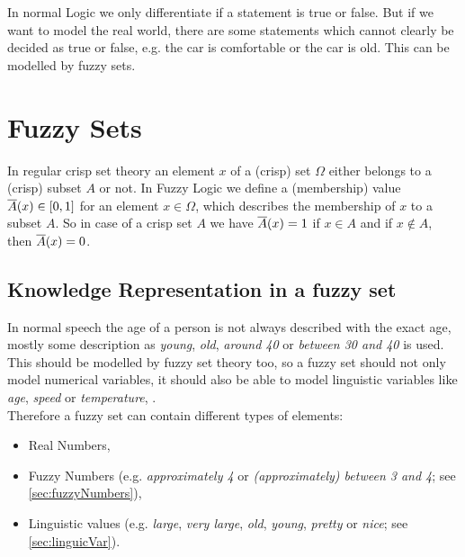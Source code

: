 

In normal Logic we only differentiate if a statement is true or false. But if we want to model the real world, there are some statements which cannot clearly be decided as true or false, e.g. the car is comfortable or the car is old. This can be modelled by fuzzy sets.


\section{Fuzzy Sets}
In regular crisp set theory an element $x$ of a (crisp) set $\Omega$ either belongs to a (crisp) subset $A$ or not. In Fuzzy Logic we define a (membership) value $\overline{A}(x)\in[0,1]$ for an element $x\in\Omega$, which describes the membership of $x$ to a subset $A$. So in case of a crisp set $A$ we have $\overline{A}(x)=1$ if $x\in A$ and if $x\notin A$, then $\overline{A}(x)=0$.

\subsection{Knowledge Representation in a fuzzy set}
In normal speech the age of a person is not always described with the exact age, mostly some description as \emph{young}, \emph{old}, \emph{around 40} or \emph{between 30 and 40} is used. \\
This should be modelled by fuzzy set theory too, so a fuzzy set should not only model numerical variables, it should also be able to model linguistic variables like \emph{age}, \emph{speed} or \emph{temperature}, \cite{IntrFuzzyControl}. \\
Therefore a fuzzy set can contain different types of elements:
\begin{itemize}
\item Real Numbers,
\item Fuzzy Numbers (e.g. \emph{approximately 4} or \emph{(approximately) between 3 and 4}; see \ref{sec:fuzzyNumbers}),
\item Linguistic values (e.g. \emph{large}, \emph{very large}, \emph{old}, \emph{young}, \emph{pretty} or \emph{nice}; see \ref{sec:linguicVar}).
\end{itemize}


